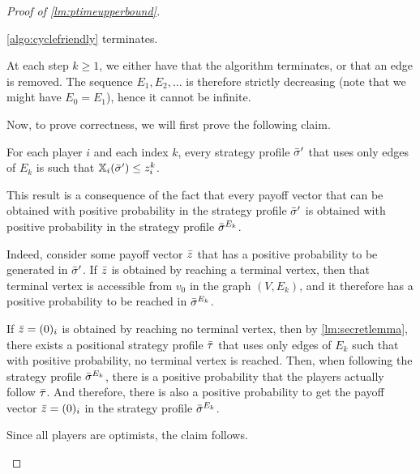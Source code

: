 \begin{proof}[Proof of \cref{lm:ptimeupperbound}]
 

\begin{claim}
    \cref{algo:cyclefriendly} terminates.
\end{claim}

\begin{claimproof}
    At each step $k \geq 1$, we either have that the algorithm terminates, or that an edge is removed.
    The sequence $E_1, E_2, \dots$ is therefore strictly decreasing (note that we might have $E_0 = E_1$), hence it cannot be infinite.
\end{claimproof}

 

Now, to prove correctness, we will first prove the following claim.

        \begin{claim} \label{claim:zik}
            For each player $i$ and each index $k$, every strategy profile ${\bar{\sigma}}'$ that uses only edges of $E_k$ is such that $\mathbb{X}_i({\bar{\sigma}}') \leq z_i^k$.
        \end{claim}

        \begin{claimproof}
            This result is a consequence of the fact that every payoff vector that can be obtained with positive probability in the strategy profile ${\bar{\sigma}}'$ is obtained with positive probability in the strategy profile ${\bar{\sigma}}^{E_k}$.
            
            Indeed, consider some payoff vector $\bar{z}$ that has a positive probability to be generated in ${\bar{\sigma}}'$.
            If $\bar{z}$ is obtained by reaching a terminal vertex, then that terminal vertex is accessible from $v_0$ in the graph $(V, E_k)$, and it therefore has a positive probability to be reached in ${\bar{\sigma}}^{E_k}$.
            
            If $\bar{z} = (0)_i$ is obtained by reaching no terminal vertex, then by \cref{lm:secretlemma}, there exists a positional strategy profile ${\bar{\tau}}$ that uses only edges of $E_k$ such that with positive probability, no terminal vertex is reached.
            Then, when following the strategy profile ${\bar{\sigma}}^{E_k}$, there is a positive probability that the players actually follow ${\bar{\tau}}$.
            And therefore, there is also a positive probability to get the payoff vector $\bar{z} = (0)_i$ in the strategy profile ${\bar{\sigma}}^{E_k}$.

            Since all players are optimists, the claim follows.
        \end{claimproof}


\end{proof}
